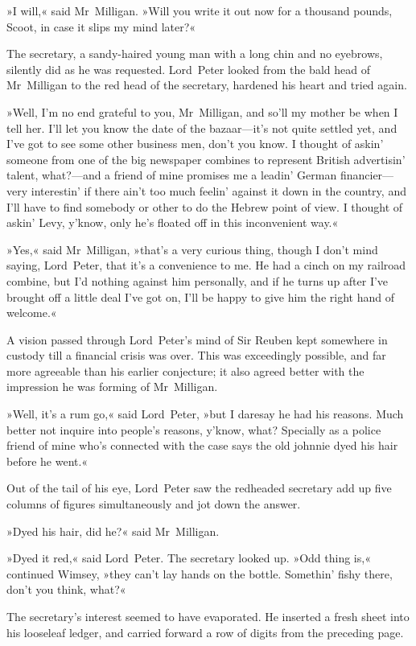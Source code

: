 »I will,« said Mr~Milligan. »Will you write it out now for a thousand pounds, Scoot, in case it slips my mind later?«

The secretary, a sandy-haired young man with a long chin and no eyebrows, silently did as he was requested. Lord~Peter looked from the bald head of Mr~Milligan to the red head of the secretary, hardened his heart and tried again.

»Well, I'm no end grateful to you, Mr~Milligan, and so'll my mother be when I tell her. I'll let you know the date of the bazaar—it's not quite settled yet, and I've got to see some other business men, don't you know. I thought of askin' someone from one of the big newspaper combines to represent British advertisin' talent, what?---and a friend of mine promises me a leadin' German financier—very interestin' if there ain't too much feelin' against it down in the country, and I'll have to find somebody or other to do the Hebrew point of view. I thought of askin' Levy, y'know, only he's floated off in this inconvenient way.«

»Yes,« said Mr~Milligan, »that's a very curious thing, though I don't mind saying, Lord~Peter, that it's a convenience to me. He had a cinch on my railroad combine, but I'd nothing against him personally, and if he turns up after I've brought off a little deal I've got on, I'll be happy to give him the right hand of welcome.«

A vision passed through Lord~Peter's mind of Sir Reuben kept somewhere in custody till a financial crisis was over. This was exceedingly possible, and far more agreeable than his earlier conjecture; it also agreed better with the impression he was forming of Mr~Milligan.

»Well, it's a rum go,« said Lord~Peter, »but I daresay he had his reasons. Much better not inquire into people's reasons, y'know, what? Specially as a police friend of mine who's connected with the case says the old johnnie dyed his hair before he went.«

Out of the tail of his eye, Lord~Peter saw the redheaded secretary add up five columns of figures simultaneously and jot down the answer.

»Dyed his hair, did he?« said Mr~Milligan.

»Dyed it red,« said Lord~Peter. The secretary looked up. »Odd thing is,« continued Wimsey, »they can't lay hands on the bottle. Somethin' fishy there, don't you think, what?«

The secretary's interest seemed to have evaporated. He inserted a fresh sheet into his looseleaf ledger, and carried forward a row of digits from the preceding page.


